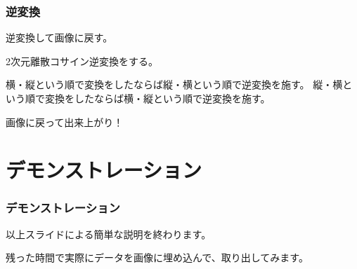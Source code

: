 \documentclass[dvipdfmx,11pt,notheorems]{beamer}
\theoremstyle{definition}
\begin{document}
\begin{frame}\frametitle{逆変換}
	\begin{block}{}
		逆変換して画像に戻す。
	\end{block}
	2次元離散コサイン逆変換をする。

	横・縦という順で変換をしたならば縦・横という順で逆変換を施す。
	縦・横という順で変換をしたならば横・縦という順で逆変換を施す。

	画像に戻って出来上がり！
\end{frame}

\section{デモンストレーション}
\begin{frame}\frametitle{デモンストレーション}
	以上スライドによる簡単な説明を終わります。

	残った時間で実際にデータを画像に埋め込んで、取り出してみます。
\end{frame}
\end{document}
